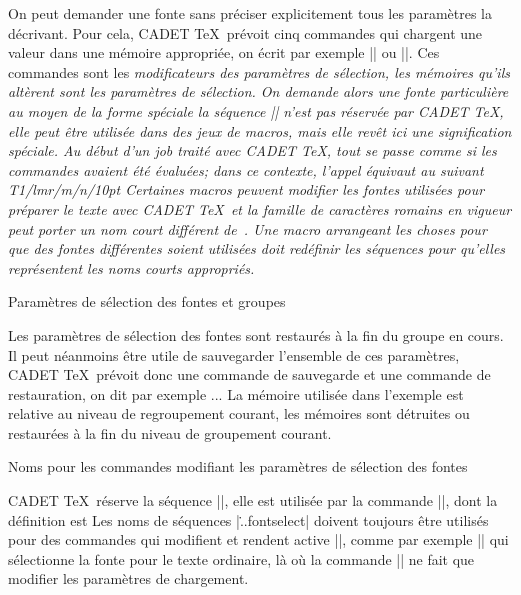 On peut demander une fonte sans préciser explicitement tous les
paramètres la décrivant. Pour cela, CADET \TeX\ prévoit cinq commandes
\begincode
\fontpage
\fontfamily
\fontseries
\fontshape
\fontsize
\endcode
qui chargent une valeur dans une mémoire appropriée, on écrit par
exemple || ou ||. Ces commandes sont les
\em{modificateurs des paramètres de sélection}, les mémoires qu'ils
altèrent sont les \em{paramètres de sélection}. On demande alors une
fonte particulière au moyen de la forme spéciale
\begincode
\fontwish\selection\as\tenrm
\endcode
la séquence |\selection| n'est pas réservée par CADET \TeX, elle peut
être utilisée dans des jeux de macros, mais elle revêt ici une
signification spéciale. Au début d'un \em{job} traité avec CADET \TeX,
tout se passe comme si les commandes
\begincode
{}
\fontsize{10pt}
\endcode
avaient été évaluées; dans ce contexte, l'appel
\begincode
\fontwish\selection\as\tenrm
\endcode
équivaut au suivant
\begincode
\fontwish T1/lmr/m/n/10pt \as\tenrm
\endcode
Certaines macros peuvent modifier les fontes utilisées pour préparer
le texte avec CADET \TeX\ et la famille de caractères romains en
vigueur peut porter un nom court différent de~. Une macro
arrangeant les choses pour que des fontes différentes soient utilisées
doit redéfinir les séquences
\begincode
\fontrmfamily
\fontsffamily
\fontttfamily
\endcode
pour qu'elles représentent les noms courts appropriés.

\formalpar Paramètres de sélection des fontes et groupes

Les paramètres de sélection des fontes sont restaurés à la fin du
groupe en cours. Il peut néanmoins être utile de sauvegarder
l'ensemble de ces paramètres, CADET \TeX\ prévoit donc une commande de
sauvegarde et une commande de restauration, on dit par exemple
\begincode
\fontselectionsave\myselection
...
\fontselectionload\myselection
\endcode
La mémoire utilisée dans l'exemple est relative au niveau de
regroupement courant, les mémoires sont détruites ou restaurées à la
fin du niveau de groupement courant.


\formalpar Noms pour les commandes modifiant les paramètres %
 de sélection des fontes

CADET \TeX\ réserve la séquence |\fontcurrent|, elle est utilisée par
la commande |\fontselect|, dont la définition est
\begincode
\def\fontselect{\fontwish\selection\as\fontcurrent\fontcurrent}
\endcode
Les noms de séquences |\...fontselect| doivent toujours être utilisés
pour des commandes qui modifient et rendent active |\fontcurrent|,
comme par exemple |\tlfontselect| qui sélectionne la fonte pour le
texte ordinaire, là où la commande |\tlfont| ne fait que modifier les
paramètres de chargement.




